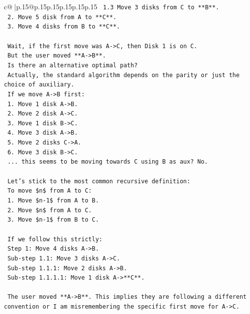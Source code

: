 \documentclass{article}
\begin{document}
{\begin{supertabular}{c@{$\;$}|p{.15\linewidth}@{}p{.15\linewidth}p{.15\linewidth}p{.15\linewidth}p{.15\linewidth}p{.15\linewidth}}
{{{\texttt{       1.3 Move 3 disks from C to **B**.} \\
\texttt{    2. Move 5 disk from A to **C**.} \\
\texttt{    3. Move 4 disks from B to **C**.} \\
\\ 
\texttt{    Wait, if the first move was A{-}>C, then Disk 1 is on C.} \\
\texttt{    But the user moved **A{-}>B**.} \\
\texttt{    Is there an alternative optimal path?} \\
\texttt{    Actually, the standard algorithm depends on the parity or just the choice of auxiliary.} \\
\texttt{    If we move A{-}>B first:} \\
\texttt{    1. Move 1 disk A{-}>B.} \\
\texttt{    2. Move 2 disk A{-}>C.} \\
\texttt{    3. Move 1 disk B{-}>C.} \\
\texttt{    4. Move 3 disk A{-}>B.} \\
\texttt{    5. Move 2 disks C{-}>A.} \\
\texttt{    6. Move 3 disk B{-}>C.} \\
\texttt{    ... this seems to be moving towards C using B as aux? No.} \\
\\ 
\texttt{    Let's stick to the most common recursive definition:} \\
\texttt{    To move \$n\$ from A to C:} \\
\texttt{    1. Move \$n{-}1\$ from A to B.} \\
\texttt{    2. Move \$n\$ from A to C.} \\
\texttt{    3. Move \$n{-}1\$ from B to C.} \\
\\ 
\texttt{    If we follow this strictly:} \\
\texttt{    Step 1: Move 4 disks A{-}>B.} \\
\texttt{       Sub{-}step 1.1: Move 3 disks A{-}>C.} \\
\texttt{          Sub{-}step 1.1.1: Move 2 disks A{-}>B.} \\
\texttt{             Sub{-}step 1.1.1.1: Move 1 disk A{-}>**C**.} \\
\\ 
\texttt{    The user moved **A{-}>B**. This implies they are following a different convention or I am misremembering the specific first move for A{-}>C.} \\
}}}
\end{supertabular}}
\end{document}
